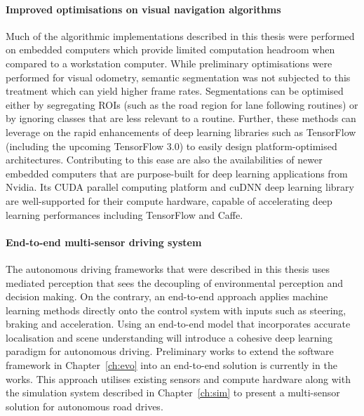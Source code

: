 \paragraph{Improved optimisations on visual navigation algorithms} Much of the algorithmic implementations described in this thesis were performed on embedded computers which provide limited computation headroom when compared to a workstation computer. While preliminary optimisations were performed for visual odometry, semantic segmentation was not subjected to this treatment which can yield higher frame rates. Segmentations can be optimised either by segregating ROIs (such as the road region for lane following routines) or by ignoring classes that are less relevant to a routine. Further, these methods can leverage on the rapid enhancements of deep learning libraries such as TensorFlow (including the upcoming TensorFlow 3.0) to easily design platform-optimised architectures. Contributing to this ease are also the availabilities of newer embedded computers that are purpose-built for deep learning applications from Nvidia. Its CUDA parallel computing platform and cuDNN deep learning library are well-supported for their compute hardware, capable of accelerating deep learning performances including TensorFlow and Caffe.

\paragraph{End-to-end multi-sensor driving system} The autonomous driving frameworks that were described in this thesis uses mediated perception that sees the decoupling of environmental perception and decision making. On the contrary, an end-to-end approach applies machine learning methods directly onto the control system with inputs such as steering, braking and acceleration. Using an end-to-end model that incorporates accurate localisation and scene understanding will introduce a cohesive deep learning paradigm for autonomous driving.
Preliminary works to extend the software framework in Chapter~\ref{ch:evo} into an end-to-end solution is currently in the works.%
This approach utilises existing sensors and compute hardware along with the simulation system described in Chapter~\ref{ch:sim} to present a multi-sensor solution for autonomous road drives. %

